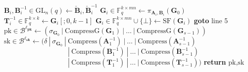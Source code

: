 \begin{algorithm}[H]
\begin{algorithmic}[1]
    \State $\textbf{B}_i, \textbf{B}_i^{-1} \in \text{GL}_n(q) \gets \check{\textbf{B}}_i, \check{\textbf{B}}_i^{-1}$
    \State $\textbf{G}_i \in \mathds{F}_q^{k \times mn} \gets \pi_{\textbf{A}_i, \textbf{B}_i}(\textbf{G}_0)$
    \State $\textbf{T}_i^{-1} \in \mathds{F}_q^{k \times k} \gets \textbf{G}_i[;0,k-1]$
    \State $\textbf{G}_i \in \mathds{F}_q^{k \times mn} \cup \{\bot\} \gets \text{SF}(\textbf{G}_i)$
        \State \textbf{goto} line 5
    \EndIf
    \EndFor
\State $\text{pk} \in \mathcal{B}^{\ell_\textbf{pk}} \gets (\sigma_{\textbf{G}_0}~|~\text{CompressG}(\textbf{G}_1)~|~\ldots~|~\text{CompressG}(\textbf{G}_{s-1}))$
\State $\text{sk} \in \mathcal{B}^{\ell_\textbf{sk}} \gets (\delta~|~\sigma_{\textbf{G}_0}~|~\text{Compress}(\textbf{A}_1^{-1})~|~\ldots~|~\text{Compress}(\textbf{A}_{s-1}^{-1})$\\
$\quad\quad\quad\quad\quad\quad\quad\quad\quad~|~\text{Compress}(\textbf{B}_1^{-1})~|~\ldots~|~\text{Compress}(\textbf{B}_{s-1}^{-1})$\\
$\quad\quad\quad\quad\quad\quad\quad\quad\quad~|~\text{Compress}(\textbf{T}_1^{-1})~|~\ldots~|~\text{Compress}(\textbf{T}_{s-1}^{-1}))$
\State \textbf{return} $\text{pk}, \text{sk}$
\end{algorithmic}
\end{algorithm}

\newpage

